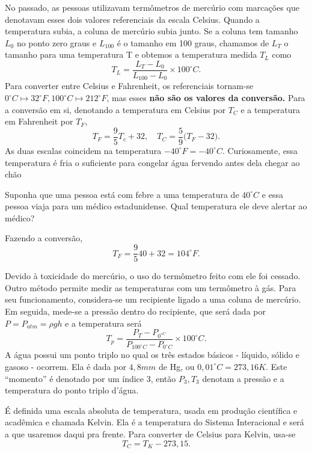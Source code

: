 \documentclass[phsyicsII_notes.tex]{subfiles}
\begin{document}
No passado, as pessoas utilizavam termômetros de mercúrio com marcações que denotavam esses dois valores referenciais da escala Celsius. Quando a temperatura subia, a coluna
de mercúrio subia junto. Se a coluna tem tamanho \(L_{0}\) no ponto zero graus e \(L_{100}\) é o tamanho em 100 graus, chamamos de \(L_{T}\) o tamanho para uma temperatura T e obtemos a
temperatura medida \(T_{L}\) como
\[
	T_{L} = \frac{L_{T} - L_{0}}{L_{100}-L_{0}}\times 100^{\circ{}}C.
\]
Para converter entre Celsius e Fahrenheit, os referenciais tornam-se \(0^{\circ{}}C\mapsto 32^{\circ{}}F, 100^{\circ{}}C\mapsto 212^{\circ{}}F\), mas esses \textbf{não são os valores da conversão.}
Para a conversão em si, denotando a temperatura em Celsius por \(T_{C}\) e a temperatura em Fahrenheit por \(T_{F}\),
\[
	T_{F} = \frac{9}{5}T_{c} + 32,\quad T_{C} = \frac{5}{9}\biggl(T_{F}-32\biggr).
\]
As duas escalas coincidem na temperatura \(-40^{\circ{}}F = -40^{\circ{}}C\). Curiosamente, essa temperatura é fria o suficiente para congelar água fervendo antes dela chegar ao chão
\begin{example}
	Suponha que uma pessoa está com febre a uma temperatura de \(40^{\circ{}}C\) e essa pessoa viaja para um médico estadunidense. Qual temperatura ele deve alertar ao médico?

	Fazendo a conversão,
	\[
		T_{F} = \frac{9}{5}40 +32 = 104^{\circ{}}F.
	\]
\end{example}
Devido à toxicidade do mercúrio, o uso do termômetro feito com ele foi cessado. Outro método permite medir as temperaturas com um termômetro à gás. Para seu funcionamento,
considera-se um recipiente ligado a uma coluna de mercúrio. Em seguida, mede-se a pressão dentro do recipiente, que será dada por \(P = P_{atm} = \rho gh\) e a temperatura será
\[
	T_{p} = \frac{P_{T} - P_{0^{\circ{}C}}}{P_{100^{\circ{}}C}-P_{0^{\circ{}}C}}\times 100^{\circ{}}C.
\]
A água possui um ponto triplo no qual os três estados básicos - líquido, sólido e gasoso - ocorrem. Ela é dada por \(4,8mm\) de Hg, ou \(0,01^{\circ{}}C = 273,16K\).
Este ``momento'' é denotado por um índice 3, então \(P_{3}, T_{3}\) denotam a pressão e a temperatura do ponto triplo d'água.

É definida uma escala absoluta de temperatura, usada em produção científica e acadêmica e chamada Kelvin. Ela é a temperatura do Sistema Interacional e será a que usaremos
daqui pra frente. Para converter de Celsius para Kelvin, usa-se
\[
	T_{C} = T_{K} - 273,15.
\]
\end{document}
